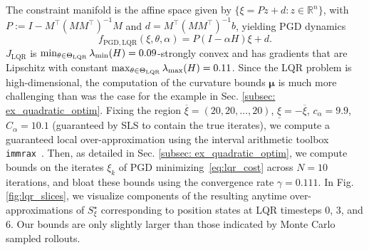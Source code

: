 \documentclass[letterpaper, 10 pt, conference]{ieeeconf}
\newcommand{\R}{\mathbb{R}}
\newcommand{\?}{\stackrel{?}{=}}
\newcommand{\objLQR}{J_{\mathrm{LQR}}}
\newcommand{\param}{\theta}
\newcommand{\paramSetLQR}{\Theta_{\mathrm{LQR}}}
\newcommand{\var}{\xi}
\newcommand{\varOpt}{\var^\star}
\newcommand{\varDim}{n}
\newcommand{\varOptSet}{S_\var^\star}
\newcommand{\ratePGD}{\alpha}
\newcommand{\ratePGDMin}{c_\ratePGD}
\newcommand{\ratePGDMax}{C_\ratePGD}
\newcommand{\convergenceRatePGD}{\gamma}
\newcommand{\dynamicsPGDLQR}{f_{\mathrm{PGD, LQR}}}
\newcommand{\iterationHorizon}{N}
\newcommand{\hessianBoundStacked}{\boldsymbol{\mu}}
\newcommand{\frank}[1]{{\textcolor[rgb]{0,0,1}{\textsf{[Frank: {#1}]}}}}
\newcommand{\antoine}[1]{{\textcolor[rgb]{1,0,0}{\textsf{[Antoine: {#1}]}}}}
\newcommand{\brendan}[1]{{\textcolor[rgb]{1,0,1}{\textsf{[Brendan: {#1}]}}}}
\begin{document}
The constraint manifold is the affine space given by $\{\var = Pz + d: z \in \R^\varDim \}$, with $P := I - M^\top (M M^\top)^{-1}M$ and $d = M^\top (MM^\top)^{-1}b$, 
yielding PGD dynamics 
{
\setlength{\abovedisplayskip}{3.5pt}
\setlength{\belowdisplayskip}{3.5pt}
\begin{equation}
    \label{eq:lqr_pgd}
    \dynamicsPGDLQR(\var, \param, \ratePGD) = P(I - \ratePGD H) \var + d.
\end{equation}
}
\hspace{-3mm}$\objLQR$ is $\min_{\param \in \paramSetLQR} \lambda_{\rm min}(H) = 0.09$-strongly convex and has gradients that are Lipschitz with constant $\max_{\param \in \paramSetLQR} \lambda_{\rm max}(H) = 0.11$.
Since the LQR problem is high-dimensional,
the 
computation of the curvature bounds $\hessianBoundStacked$ is 
much
more challenging than was the case for the
example in Sec. \ref{subsec: ex_quadratic_optim}.
Fixing the region $\overline{\var} = (20, 20, \ldots, 20)$, $\underline{\var} = - \overline{\var}$, $\ratePGDMin=9.9$, $\ratePGDMax=10.1$ (guaranteed by SLS to contain the true iterates), we 
compute a guaranteed local over-approximation using the interval arithmetic toolbox {\tt immrax}~\cite{immrax}.
Then,
as detailed
in Sec. \ref{subsec: ex_quadratic_optim}, 
we compute bounds on the iterates $\xi_k$ of PGD minimizing~\eqref{eq:lqr_cost}
across $\iterationHorizon = 10$ iterations, and bloat these bounds using the convergence rate $\convergenceRatePGD = 0.111$.
In Fig. \ref{fig:lqr_slices}, we visualize components of the resulting anytime over-approximations of
$\varOptSet$
corresponding to position states at LQR timesteps 0, 3, and 6.
Our bounds are only slightly larger than 
those indicated by
Monte Carlo sampled rollouts. 
\end{document}
